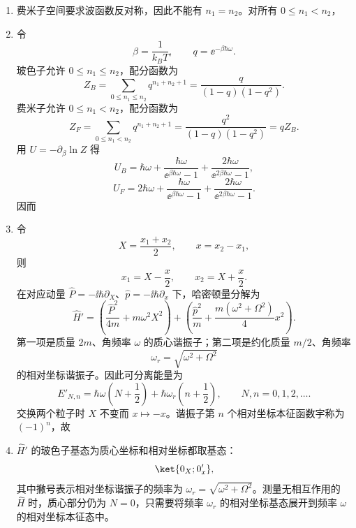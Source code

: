 \begin{question}[共 30 分]
\begin{solution}
\begin{enumerate}
\[  \]
  等价地，可以统一写成 $0\le n_1\le n_2$，能量 $\hbar\omega(n_1+n_2+1)$，波函数按 $n_1=n_2$ 与 $n_1<n_2$ 分别采用上述归一化形式。
  \item 费米子空间要求波函数反对称，因此不能有 $n_1=n_2$。对所有 $0\le n_1<n_2$，
  \item 令
  \[
  \beta=\frac{1}{k_BT},\qquad q=\ee^{-\beta\hbar\omega}.
  \]
  玻色子允许 $0\le n_1\le n_2$，配分函数为
  \[
  Z_B=\sum_{0\le n_1\le n_2}q^{n_1+n_2+1}
  =\frac{q}{(1-q)(1-q^2)}.
  \]
  费米子允许 $0\le n_1<n_2$，配分函数为
  \[
  Z_F=\sum_{0\le n_1<n_2}q^{n_1+n_2+1}
  =\frac{q^2}{(1-q)(1-q^2)}=qZ_B.
  \]
  用 $U=-\partial_\beta\ln Z$ 得
  \[
  U_B=\hbar\omega+\frac{\hbar\omega}{\ee^{\beta\hbar\omega}-1}
  +\frac{2\hbar\omega}{\ee^{2\beta\hbar\omega}-1},
  \]
  \[
  U_F=2\hbar\omega+\frac{\hbar\omega}{\ee^{\beta\hbar\omega}-1}
  +\frac{2\hbar\omega}{\ee^{2\beta\hbar\omega}-1}.
  \]
  因而
  \item 令
  \[
  X=\frac{x_1+x_2}{2},\qquad x=x_2-x_1,
  \]
  则
  \[
  x_1=X-\frac{x}{2},
  \qquad
  x_2=X+\frac{x}{2}.
  \]
  在对应动量 $\hat P=-\ii\hbar\partial_X$、$\hat p=-\ii\hbar\partial_x$ 下，哈密顿量分解为
  \[
  \hat H'=\left(\frac{\hat P^2}{4m}+m\omega^2X^2\right)
  +\left(\frac{\hat p^2}{m}+\frac{m(\omega^2+\Omega^2)}{4}x^2\right).
  \]
  第一项是质量 $2m$、角频率 $\omega$ 的质心谐振子；第二项是约化质量 $m/2$、角频率
  \[
  \omega_r=\sqrt{\omega^2+\Omega^2}
  \]
  的相对坐标谐振子。因此可分离能量为
  \[
  E'_{N,n}=\hbar\omega\left(N+\frac12\right)+\hbar\omega_r\left(n+\frac12\right),
  \qquad N,n=0,1,2,
  \dots .
  \]
  交换两个粒子时 $X$ 不变而 $x\mapsto -x$。谐振子第 $n$ 个相对坐标本征函数宇称为 $(-1)^n$，故
  \item $\hat H'$ 的玻色子基态为质心坐标和相对坐标都取基态：
  \[
  \ket{0_X;0'_x},
  \]
  其中撇号表示相对坐标谐振子的频率为 $\omega_r=\sqrt{\omega^2+\Omega^2}$。测量无相互作用的 $\hat H$ 时，质心部分仍为 $N=0$，只需要将频率 $\omega_r$ 的相对坐标基态展开到频率 $\omega$ 的相对坐标本征态中。


\end{enumerate}
\end{solution}
\end{question}
